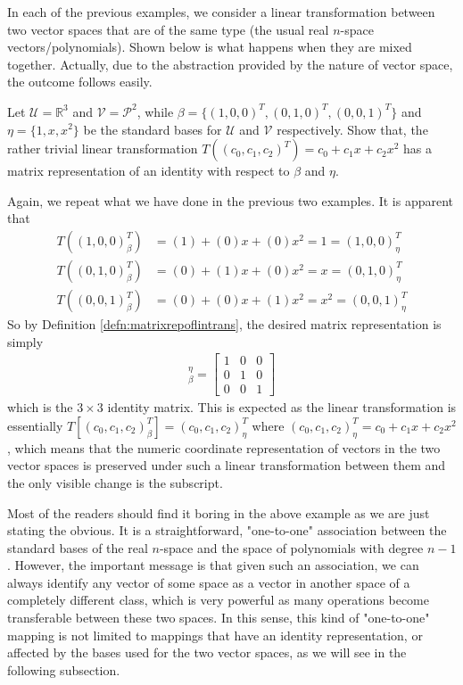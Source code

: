 In each of the previous examples, we consider a linear transformation between two vector spaces that are of the same type (the usual real $n$-space vectors/polynomials). Shown below is what happens when they are mixed together. Actually, due to the abstraction provided by the nature of vector space, the outcome follows easily.
\begin{exmp}
Let $\mathcal{U} = \mathbb{R}^3$ and $\mathcal{V} = \mathcal{P}^2$, while $\mathcal{\beta} = \{(1,0,0)^T, \allowbreak (0,1,0)^T, (0,0,1)^T\}$ and $\mathcal{\eta} = \{1, x, x^2\}$ be the standard bases for $\mathcal{U}$ and $\mathcal{V}$ respectively. Show that, the rather trivial linear transformation $T((c_0, c_1, c_2)^T) = c_0 + c_1x + c_2x^2$ has a matrix representation of an identity with respect to $\mathcal{\beta}$ and $\mathcal{\eta}$.
\end{exmp}
\begin{solution}
Again, we repeat what we have done in the previous two examples. It is apparent that
\begin{align*}
T((1,0,0)^T_\beta) &= (1) + (0)x + (0)x^2 = 1 = (1,0,0)^T_\eta\\
T((0,1,0)^T_\beta) &= (0) + (1)x + (0)x^2 = x = (0,1,0)^T_\eta\\
T((0,0,1)^T_\beta) &= (0) + (0)x + (1)x^2 = x^2 = (0,0,1)^T_\eta
\end{align*}
So by Definition \ref{defn:matrixrepoflintrans}, the desired matrix representation is simply
\begin{align*}
[T]_\beta^\eta = 
\begin{bmatrix}
1 & 0 & 0 \\
0 & 1 & 0 \\
0 & 0 & 1
\end{bmatrix}
\end{align*}
which is the $3 \times 3$ identity matrix. This is expected as the linear transformation is essentially $T[(c_0, c_1, c_2)_\beta^T] = (c_0, c_1, c_2)_\eta^T$ where $(c_0, c_1, c_2)_\eta^T = c_0 + c_1x + c_2x^2$, which means that the numeric coordinate representation of vectors in the two vector spaces is preserved under such a linear transformation between them and the only visible change is the subscript.
\end{solution}
Most of the readers should find it boring in the above example as we are just stating the obvious. It is a straightforward, "one-to-one" association between the standard bases of the real $n$-space and the space of polynomials with degree $n-1$. However, the important message is that given such an association, we can always identify any vector of some space as a vector in another space of a completely different class, which is very powerful as many operations become transferable between these two spaces. In this sense, this kind of "one-to-one" mapping is not limited to mappings that have an identity representation, or affected by the bases used for the two vector spaces, as we will see in the following subsection.

